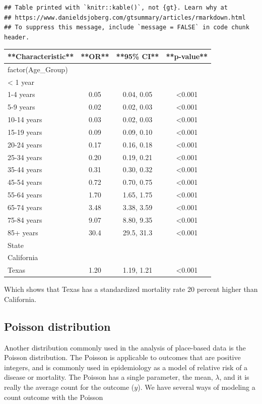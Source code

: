 \documentclass[
]{article}
\begin{document}
\begin{verbatim}
## Table printed with `knitr::kable()`, not {gt}. Learn why at
## https://www.danieldsjoberg.com/gtsummary/articles/rmarkdown.html
## To suppress this message, include `message = FALSE` in code chunk header.
\end{verbatim}

\begin{tabular}{l|c|c|c}
\hline
**Characteristic** & **OR** & **95\% CI** & **p-value**\\
\hline
factor(Age\_Group) &  &  & \\
\hline
< 1 year &  &  & \\
\hline
1-4 years & 0.05 & 0.04, 0.05 & <0.001\\
\hline
5-9 years & 0.02 & 0.02, 0.03 & <0.001\\
\hline
10-14 years & 0.03 & 0.02, 0.03 & <0.001\\
\hline
15-19 years & 0.09 & 0.09, 0.10 & <0.001\\
\hline
20-24 years & 0.17 & 0.16, 0.18 & <0.001\\
\hline
25-34 years & 0.20 & 0.19, 0.21 & <0.001\\
\hline
35-44 years & 0.31 & 0.30, 0.32 & <0.001\\
\hline
45-54 years & 0.72 & 0.70, 0.75 & <0.001\\
\hline
55-64 years & 1.70 & 1.65, 1.75 & <0.001\\
\hline
65-74 years & 3.48 & 3.38, 3.59 & <0.001\\
\hline
75-84 years & 9.07 & 8.80, 9.35 & <0.001\\
\hline
85+ years & 30.4 & 29.5, 31.3 & <0.001\\
\hline
State &  &  & \\
\hline
California &  &  & \\
\hline
Texas & 1.20 & 1.19, 1.21 & <0.001\\
\hline
\end{tabular}

Which shows that Texas has a standardized mortality rate 20 percent higher than California.

\hypertarget{poisson-distribution}{%
\subsection{Poisson distribution}\label{poisson-distribution}}

Another distribution commonly used in the analysis of place-based data is the Poisson distribution. The Poisson is applicable to outcomes that are positive integers, and is commonly used in epidemiology as a model of relative risk of a disease or mortality. The Poisson has a single parameter, the mean, \(\lambda\), and it is really the average count for the outcome (\(y\)). We have several ways of modeling a count outcome with the Poisson
\end{document}
